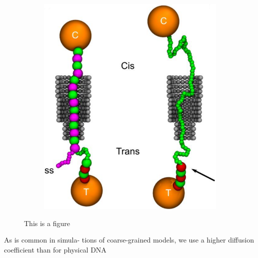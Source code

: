 \begin{figure}[ht]
\begin{centering}
\begin{subfigure}[t]{\dimexpr.5\linewidth-1.3em\relax}
  \includegraphics[width=0.9\linewidth,valign=t]{Figures/Stefanos2.png}
  \end{subfigure}
  \caption{This is a figure}
  \label{fig:test}
  \end{centering}
\end{figure}


As is common in simula- tions of coarse-grained models, we use a higher diffusion
coefficient than for physical DNA
